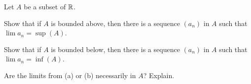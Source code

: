 \begin{comment}

\ExerciseSolution 

\ba

\item We prove that $(a_n)$ converges to $1$. Let $\epsilon$ be a positive real number. We know there is an $N \in \Z^+$ such that $\frac{1}{N} < \epsilon$. Then if $n \geq N$, 
\[|a_n - 1| = \left|\frac{1}{n}\right| < \frac{1}{N} < \epsilon.\]
Therefore, $\lim a_n = 1$. 

\item We prove that $(a_n)$ has no limit. Let $a = (u,v)$ be a point in $\R^2$ and let $\epsilon$ be a positive real number.  We know that 
\[d_M(a_n,a) = \max\{|2-u|, |n-v|\}.\]
By the Archimedean property, there is $M \in \Z^+$ such that $M - v \geq \epsilon$. So if $n \geq M$ we have 
\[d_M(a_n,a) = \max\{|2-u|, |n-v|\} \geq |n-v| > M-v \geq \epsilon.\] 
So there can be no $N \in \Z^+$ with $d_M(a_n,a) < \epsilon$ whenever $n \geq N$. We conclude that the sequence $(a_n)$ has no limit. 

\item We prove that the sequence $(a_n)$ converges to the constant function $a$ defined by $a(x) = 0$ for all $x \in [0,1]$. Notice that $a_n(x)$ is the linear function connecting the points $(0,0)$ and $\left(1,\frac{1}{n}\right)$. So 
\[d(a_n,a) = \sup\{|a_n(x)-a(x)| \mid x \in [0,1]\} = \left(\frac{1}{n}-0\right| = \frac{1}{n}.\]
Let $\epsilon > 0$. By the Archimedean property, there is an $N \in \Z^+$ such that $N > \frac{1}{\epsilon}$. Then for $n \geq N$ we have 
\[d(a_n,a) = \frac{1}{n} \leq \frac{1}{N} < \epsilon.\]

\ea

\end{comment}


\item Let $A$ be a subset of $\mathbb{R}$.

\ba

\item Show that if $A$ is bounded above, then there is a sequence $(a_n)$ in $A$ such that $\lim a_n = \sup(A)$. 

\item Show that if $A$ is bounded below, then there is a sequence $(a_n)$ in $A$ such that $\lim a_n = \inf(A)$. 

\item Are the limits from (a) or (b) necessarily in $A$? Explain.
\ea

